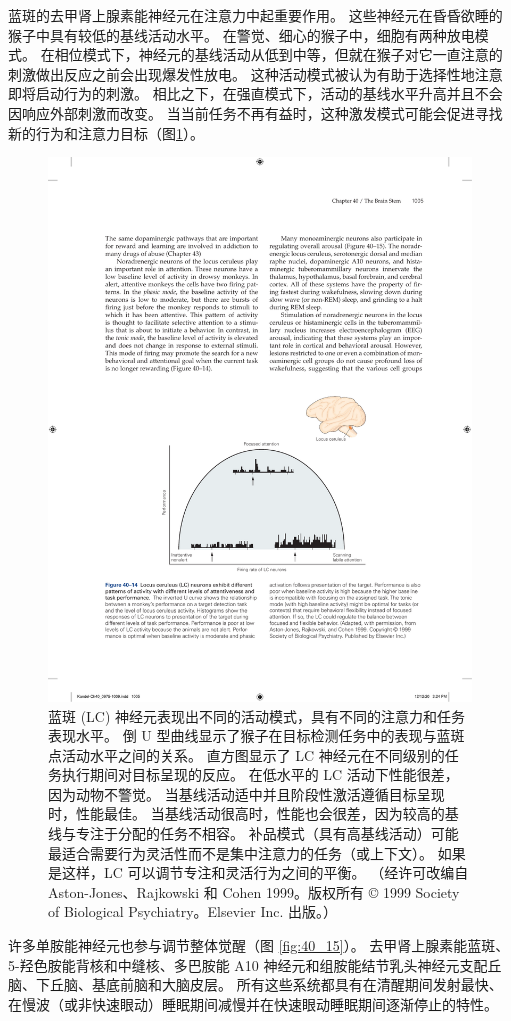 蓝斑的去甲肾上腺素能神经元在注意力中起重要作用。 这些神经元在昏昏欲睡的猴子中具有较低的基线活动水平。 在警觉、细心的猴子中，细胞有两种放电模式。 在相位模式下，神经元的基线活动从低到中等，但就在猴子对它一直注意的刺激做出反应之前会出现爆发性放电。 这种活动模式被认为有助于选择性地注意即将启动行为的刺激。 相比之下，在强直模式下，活动的基线水平升高并且不会因响应外部刺激而改变。 
当当前任务不再有益时，这种激发模式可能会促进寻找新的行为和注意力目标（图\ref{fig:40_14}）。

\begin{figure}[htbp]
	\centering
	\includegraphics[width=0.65\linewidth]{chap40/fig_40_14}
	\caption{蓝斑 (LC) 神经元表现出不同的活动模式，具有不同的注意力和任务表现水平。 倒 U 型曲线显示了猴子在目标检测任务中的表现与蓝斑点活动水平之间的关系。 直方图显示了 LC 神经元在不同级别的任务执行期间对目标呈现的反应。 在低水平的 LC 活动下性能很差，因为动物不警觉。 当基线活动适中并且阶段性激活遵循目标呈现时，性能最佳。 当基线活动很高时，性能也会很差，因为较高的基线与专注于分配的任务不相容。 补品模式（具有高基线活动）可能最适合需要行为灵活性而不是集中注意力的任务（或上下文）。 如果是这样，LC 可以调节专注和灵活行为之间的平衡。 （经许可改编自 Aston-Jones、Rajkowski 和 Cohen 1999。版权所有 © 1999 Society of Biological Psychiatry。Elsevier Inc. 出版。）}
	\label{fig:40_14}
\end{figure}

许多单胺能神经元也参与调节整体觉醒（图 \ref{fig:40_15}）。 
去甲肾上腺素能蓝斑、5-羟色胺能背核和中缝核、多巴胺能 A10 神经元和组胺能结节乳头神经元支配丘脑、下丘脑、基底前脑和大脑皮层。 所有这些系统都具有在清醒期间发射最快、在慢波（或非快速眼动）睡眠期间减慢并在快速眼动睡眠期间逐渐停止的特性。

